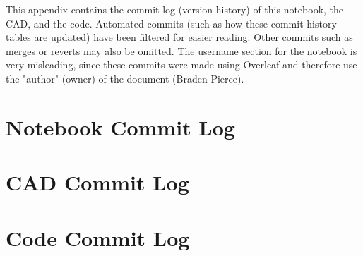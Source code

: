 This appendix contains the commit log (version history) of this notebook, the
CAD, and the code. Automated commits (such as how these commit history tables
are updated) have been filtered for easier reading. Other commits such as merges
or reverts may also be omitted. The username section for the notebook is very misleading, 
since these commits were made using Overleaf and therefore use the "author" (owner) of the 
document (Braden Pierce). 
\section{Notebook Commit Log}

\section{CAD Commit Log}

\section{Code Commit Log}

